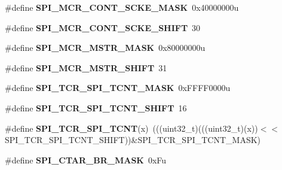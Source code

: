\begin{DoxyCompactItemize}
\item 
\#define {\bfseries S\+P\+I\+\_\+\+M\+C\+R\+\_\+\+C\+O\+N\+T\+\_\+\+S\+C\+K\+E\+\_\+\+M\+A\+SK}~0x40000000u\hypertarget{group__SPI__Register__Masks_gad40a2cace787fe5eaaf74379ffb7cfc2}{}\label{group__SPI__Register__Masks_gad40a2cace787fe5eaaf74379ffb7cfc2}

\item 
\#define {\bfseries S\+P\+I\+\_\+\+M\+C\+R\+\_\+\+C\+O\+N\+T\+\_\+\+S\+C\+K\+E\+\_\+\+S\+H\+I\+FT}~30\hypertarget{group__SPI__Register__Masks_ga57c862186e43a26823716267bfadd92f}{}\label{group__SPI__Register__Masks_ga57c862186e43a26823716267bfadd92f}

\item 
\#define {\bfseries S\+P\+I\+\_\+\+M\+C\+R\+\_\+\+M\+S\+T\+R\+\_\+\+M\+A\+SK}~0x80000000u\hypertarget{group__SPI__Register__Masks_gaa201344af736c83618497329b6529f04}{}\label{group__SPI__Register__Masks_gaa201344af736c83618497329b6529f04}

\item 
\#define {\bfseries S\+P\+I\+\_\+\+M\+C\+R\+\_\+\+M\+S\+T\+R\+\_\+\+S\+H\+I\+FT}~31\hypertarget{group__SPI__Register__Masks_ga7118ec0360c840ddef7e666831cb13fb}{}\label{group__SPI__Register__Masks_ga7118ec0360c840ddef7e666831cb13fb}

\item 
\#define {\bfseries S\+P\+I\+\_\+\+T\+C\+R\+\_\+\+S\+P\+I\+\_\+\+T\+C\+N\+T\+\_\+\+M\+A\+SK}~0x\+F\+F\+F\+F0000u\hypertarget{group__SPI__Register__Masks_ga3b9bdb39b00af35d3f731123bc82d143}{}\label{group__SPI__Register__Masks_ga3b9bdb39b00af35d3f731123bc82d143}

\item 
\#define {\bfseries S\+P\+I\+\_\+\+T\+C\+R\+\_\+\+S\+P\+I\+\_\+\+T\+C\+N\+T\+\_\+\+S\+H\+I\+FT}~16\hypertarget{group__SPI__Register__Masks_ga4ac4f90bab2c1a761f439f50bcdca71f}{}\label{group__SPI__Register__Masks_ga4ac4f90bab2c1a761f439f50bcdca71f}

\item 
\#define {\bfseries S\+P\+I\+\_\+\+T\+C\+R\+\_\+\+S\+P\+I\+\_\+\+T\+C\+NT}(x)~(((uint32\+\_\+t)(((uint32\+\_\+t)(x))$<$$<$S\+P\+I\+\_\+\+T\+C\+R\+\_\+\+S\+P\+I\+\_\+\+T\+C\+N\+T\+\_\+\+S\+H\+I\+FT))\&S\+P\+I\+\_\+\+T\+C\+R\+\_\+\+S\+P\+I\+\_\+\+T\+C\+N\+T\+\_\+\+M\+A\+SK)\hypertarget{group__SPI__Register__Masks_ga3e79144ff705279f17e657cd3d596afa}{}\label{group__SPI__Register__Masks_ga3e79144ff705279f17e657cd3d596afa}

\item 
\#define {\bfseries S\+P\+I\+\_\+\+C\+T\+A\+R\+\_\+\+B\+R\+\_\+\+M\+A\+SK}~0x\+Fu\hypertarget{group__SPI__Register__Masks_gad1ba5817c825831950fc73cc726f0737}{}\label{group__SPI__Register__Masks_gad1ba5817c825831950fc73cc726f0737}


\end{DoxyCompactItemize}
